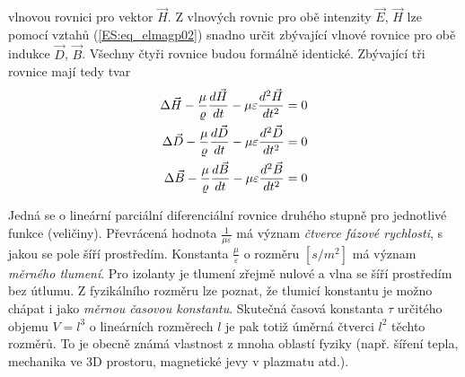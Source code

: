     vlnovou rovnici pro vektor \(\vec{H}\). Z vlnových rovnic pro obě intenzity \(\vec{E}\), 
    \(\vec{H}\) lze pomocí vztahů (\ref{ES:eq_elmagp02}) snadno určit zbývající vlnové rovnice pro 
    obě indukce \(\vec{D}\), \(\vec{B}\). Všechny čtyři rovnice budou formálně identické. Zbývající 
    tři rovnice mají tedy tvar
    \begin{subequations}
      \begin{align}
        \Delta\vec{H} - \frac{\mu}{\varrho}\dfrac{d \vec{H}}{d t} 
          - \mu\varepsilon\dfrac{d^2 \vec{H}}{d t^2} &= 0   \label{ES:eq_elmagp06a}          \\
        \Delta\vec{D} - \frac{\mu}{\varrho}\dfrac{d \vec{D}}{d t} 
          - \mu\varepsilon\dfrac{d^2 \vec{D}}{d t^2} &= 0   \label{ES:eq_elmagp06b}          \\
        \Delta\vec{B} - \frac{\mu}{\varrho}\dfrac{d \vec{B}}{d t} 
          - \mu\varepsilon\dfrac{d^2 \vec{B}}{d t^2} &= 0   \label{ES:eq_elmagp06c}
      \end{align}
    \end{subequations}

    
    Jedná se o lineární parciální diferenciální rovnice druhého stupně pro jednotlivé funkce 
    (veličiny). Převrácená hodnota \(\frac{1}{\mu\varepsilon}\) má význam \emph{čtverce fázové 
    rychlosti}, s jakou se pole šíří prostředím. Konstanta \(\frac{\mu}{\varepsilon}\) o rozměru 
    \([s/m^2]\) má význam \emph{měrného tlumení}. Pro izolanty je tlumení zřejmě nulové a vlna se 
    šíří prostředím bez útlumu. Z fyzikálního rozměru lze poznat, že tlumicí konstantu je možno 
    chápat i jako \emph{měrnou časovou konstantu}. Skutečná časová konstanta \(\tau\) určitého 
    objemu \(V=l^3\) o lineárních rozměrech \(l\) je pak totiž úměrná čtverci \(l^2\) těchto 
    rozměrů. To je obecně známá vlastnost z mnoha oblastí fyziky (např. šíření tepla, mechanika ve 
    3D prostoru, magnetické jevy v plazmatu atd.).
  
